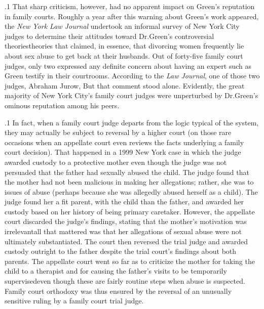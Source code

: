 \documentclass[11pt, twoside]{article}
\begin{document}
{\p.1{%
\:That sharp criticism, however, had no apparent impact on Green’s
reputation in family courts. Roughly a year after this warning about
Green’s work appeared, the \textit{New York Law Journal} undertook an informal survey of New York City judges to determine their attitudes toward
Dr.\@ Green’s controversial theories\mdash{}theories that claimed, in essence,
that divorcing women frequently lie about sex abuse to get back at their
husbands. Out of forty-five family court judges, only two expressed any
definite concern about having an expert such as Green testify in their
courtrooms. According to the \textit{Law Journal}, one of those two judges,
Abraham Jurow,  But that comment stood
alone. Evidently, the great majority of New York City’s family court
judges were unperturbed by Dr.\@ Green’s ominous reputation among his
peers.\;
}%

\p.1{%
\:In fact, when a family court judge departs from the  logic typical
of the system, they may actually be subject to reversal by a higher court
(on those rare occasions when an appellate court even reviews the facts
underlying a family court decision). That happened in a 1999 New York
case in which the judge awarded custody to a protective mother even
though the judge was not persuaded that the father had sexually abused
the child. The judge found that the mother had not been malicious
in making her allegations; rather, she was  to issues of
abuse (perhaps because she was allegedly abused herself as a child). The
judge found her a fit parent,  with the child than the father, and awarded her custody based on her history of being primary
caretaker. However, the appellate court discarded the judge’s findings,
stating that the mother’s motivation was irrelevant\mdash{}all that mattered
was that her allegations of sexual abuse were not ultimately substantiated. The court then reversed the trial judge and awarded custody
outright to the father despite the trial court’s findings about both parents. The appellate court went so far as to criticize the mother for taking
the child to a therapist and for causing the father’s visits to be temporarily supervised\mdash{}even though these are fairly routine steps when abuse is
suspected. Family court orthodoxy was thus ensured by the reversal of
an unusually sensitive ruling by a family court trial judge.\;
}%


}
\end{document}
